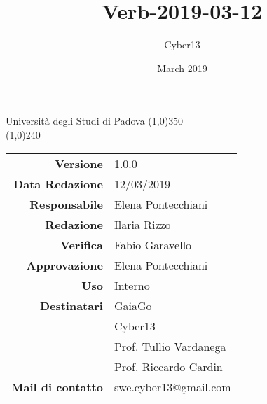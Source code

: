 \documentclass[a4paper, oneside, openany, dvipsnames, table]{article}
\title{Verb-2019-03-12}
\author{Cyber13}
\date{March 2019}
\begin{document}
\begin{titlepage}
		\centering Università degli Studi di Padova
		\line(1,0){350}\\
		\vspace{1.2cm}
		\logo
		\vspace{1.0cm}
		\vspace{0.5cm}
		\vspace{0.5cm}
		\line(1,0){240}\\
		\begin{tabular}{r|l}
			{\textbf{Versione}} 			& 1.0.0\\
			{\textbf{Data Redazione}} 	& 12/03/2019\\	%
			{\textbf{Responsabile}} 	& Elena Pontecchiani\\	%
			{\textbf{Redazione}} 		& Ilaria Rizzo\\ 
			{\textbf{Verifica}} 			& Fabio Garavello\\ 
			{\textbf{Approvazione}} 		& Elena Pontecchiani\\
			{\textbf{Uso}} 				& Interno\\
			{\textbf{Destinatari}} & GaiaGo\\ 	& Cyber13\\ & Prof. Tullio Vardanega\\ & Prof. Riccardo Cardin\\
			{\textbf{Mail di contatto}} 	& swe.cyber13@gmail.com\\
		\end{tabular}\\
	\end{titlepage}
	
	
\newpage
		



\newpage
\tableofcontents
\newpage
\end{document}
